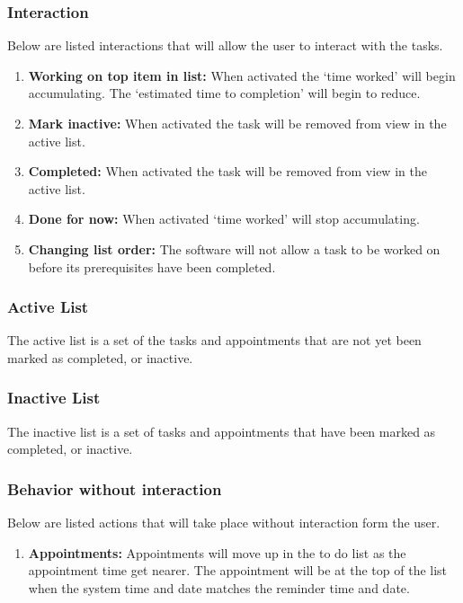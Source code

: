 \documentclass[12pt,a4paper]{article}
\begin{document}
\subsubsection{Interaction}
Below are listed interactions that will allow the user to interact with the tasks.
\begin{enumerate}
\item \textbf{Working on top item in list:} When activated the `time worked' will begin accumulating. The `estimated time to completion' will begin to reduce.
\item \textbf{Mark inactive:} When activated the task will be removed from view in the active list.
\item \textbf{Completed:} When activated the task will be removed from view in the active list.
\item \textbf{Done for now:} When activated `time worked' will stop accumulating.
\item \textbf{Changing list order:} The software will not allow a task to be worked on before its prerequisites have been completed. 
\end{enumerate}

\subsubsection{Active List}
The active list is a set of the tasks and appointments that are not yet been marked as completed, or inactive.

\subsubsection{Inactive List}
The inactive list is a set of tasks and appointments that have been marked as completed, or inactive. 

\subsubsection{Behavior without interaction}
Below are listed actions that will take place without interaction form the user.
\begin{enumerate}
\item \textbf{Appointments:} Appointments will move up in the to do list as the appointment time get nearer.  The appointment will be at the top of the list when the system time and date matches the reminder time and date.
\end{enumerate}
\end{document}
